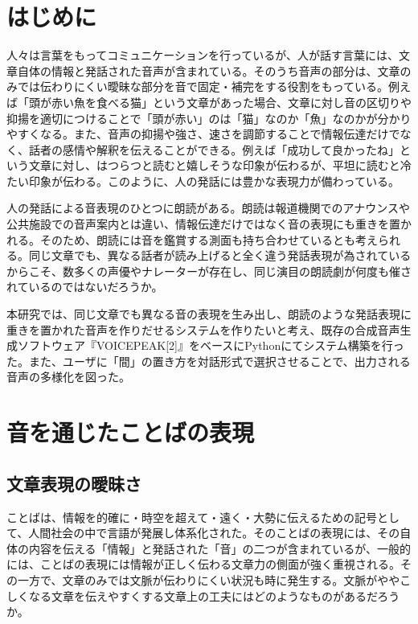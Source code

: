 



\section{はじめに}

人々は言葉をもってコミュニケーションを行っているが、人が話す言葉には、文章自体の情報と発話された音声が含まれている。そのうち音声の部分は、文章のみでは伝わりにくい曖昧な部分を音で固定・補完をする役割をもっている。例えば「頭が赤い魚を食べる猫」\cite{twitter}という文章があった場合、文章に対し音の区切りや抑揚を適切につけることで「頭が赤い」のは「猫」なのか「魚」なのかが分かりやすくなる。また、音声の抑揚や強さ、速さを調節することで情報伝達だけでなく、話者の感情や解釈を伝えることができる。例えば「成功して良かったね」という文章に対し、はつらつと読むと嬉しそうな印象が伝わるが、平坦に読むと冷たい印象が伝わる。このように、人の発話には豊かな表現力が備わっている。

人の発話による音表現のひとつに朗読がある。朗読は報道機関でのアナウンスや公共施設での音声案内とは違い、情報伝達だけではなく音の表現にも重きを置かれる。そのため、朗読には音を鑑賞する測面も持ち合わせているとも考えられる。同じ文章でも、異なる話者が読み上げると全く違う発話表現が為されているからこそ、数多くの声優やナレーターが存在し、同じ演目の朗読劇が何度も催されているのではないだろうか。

本研究では、同じ文章でも異なる音の表現を生み出し、朗読のような発話表現に重きを置かれた音声を作りだせるシステムを作りたいと考え、既存の合成音声生成ソフトウェア『VOICEPEAK[2]』をベースにPythonにてシステム構築を行った。また、ユーザに「間」の置き方を対話形式で選択させることで、出力される音声の多様化を図った。




\section{音を通じたことばの表現}
\subsection{文章表現の曖昧さ}
ことばは、情報を的確に・時空を超えて・遠く・大勢に伝えるための記号として、人間社会の中で言語が発展し体系化された。そのことばの表現には、その自体の内容を伝える「情報」と発話された「音」の二つが含まれているが、一般的には、ことばの表現には情報が正しく伝わる文章力の側面が強く重視される。その一方で、文章のみでは文脈が伝わりにくい状況も時に発生する。文脈がややこしくなる文章を伝えやすくする文章上の工夫にはどのようなものがあるだろうか。

